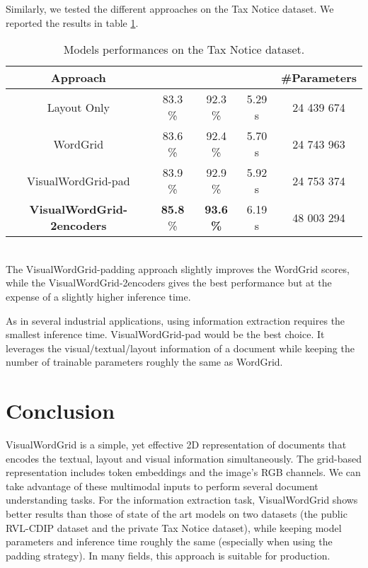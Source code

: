 \documentclass[runningheads]{llncs}
\begin{document}
Similarly, we tested the different approaches on the Tax Notice dataset. We reported the results in table \ref{tab2}.
 \begin{table}[!htbp] 
\label{tab:schemes2} 
\caption{Models performances  on the Tax Notice dataset.}
\label{tab2}
\centering 
\renewcommand{\arraystretch}{1.5} 
\begin{tabular}{|c|c|c|c|c|}
\hline
 Approach &  &   &  & \#Parameters   \\
\hline

Layout Only  & 83.3 \%   &   92.3 \% & 5.29 s & 24 439 674\\
\hline
WordGrid  & 83.6 \%   &  92.4 \% & 5.70 s & 24 743 963\\
\hline
VisualWordGrid-pad  & 83.9 \%  &  92.9 \% & 5.92 s &  24 753 374\\
\hline
\textbf{VisualWordGrid-2encoders}  & \textbf{85.8} \%   &  \textbf{93.6 \%} & 6.19 s & 48 003 294 \\

\hline
\end{tabular}
\end{table}\\

The VisualWordGrid-padding approach slightly improves the WordGrid scores, while the VisualWordGrid-2encoders gives the best performance but at the expense of a slightly  higher inference time.

As in several industrial applications, using information extraction requires the smallest inference time. VisualWordGrid-pad would be the best choice. It leverages the visual/textual/layout information of a document while keeping the number of trainable parameters roughly the same as WordGrid. 

\section{Conclusion}
VisualWordGrid is a simple, yet  effective 2D representation of documents that encodes the textual, layout and visual information simultaneously. The grid-based representation includes token embeddings and the image's RGB channels. We can take advantage of these multimodal inputs to perform several document understanding tasks. For the information extraction task, VisualWordGrid shows better results than those of  state of the art models on two datasets (the public RVL-CDIP dataset and  the private Tax Notice dataset), while keeping model parameters and inference time roughly the same (especially when using the padding strategy). In many fields, this approach is suitable  for production.



\end{document}

